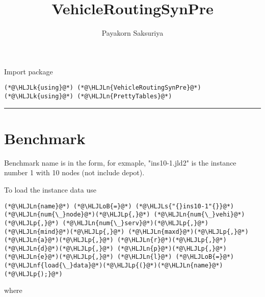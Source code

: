 \documentclass[12pt,a4paper]{article}
\title{ VehicleRoutingSynPre }
\author{ Payakorn Saksuriya }
\newcommand{\HLJLk}[1]{\textcolor[RGB]{148,91,176}{\textbf{#1}}}
\newcommand{\HLJLn}[1]{#1}
\newcommand{\HLJLnf}[1]{\textcolor[RGB]{66,102,213}{#1}}
\newcommand{\HLJLs}[1]{\textcolor[RGB]{201,61,57}{#1}}
\newcommand{\HLJLoB}[1]{\textcolor[RGB]{102,102,102}{\textbf{#1}}}
\newcommand{\HLJLp}[1]{#1}
\begin{document}
\maketitle

Import package


\begin{lstlisting}
(*@\HLJLk{using}@*) (*@\HLJLn{VehicleRoutingSynPre}@*)
(*@\HLJLk{using}@*) (*@\HLJLn{PrettyTables}@*)
\end{lstlisting}


\rule{\textwidth}{1pt}
\section{Benchmark}
Benchmark name is in the form, for exmaple, "ins10-1.jld2" is the instance number 1 with 10 nodes (not include depot).

To load the instance data use


\begin{lstlisting}
(*@\HLJLn{name}@*) (*@\HLJLoB{=}@*) (*@\HLJLs{"{}ins10-1"{}}@*)
(*@\HLJLn{num{\_}node}@*)(*@\HLJLp{,}@*) (*@\HLJLn{num{\_}vehi}@*)(*@\HLJLp{,}@*) (*@\HLJLn{num{\_}serv}@*)(*@\HLJLp{,}@*) (*@\HLJLn{mind}@*)(*@\HLJLp{,}@*) (*@\HLJLn{maxd}@*)(*@\HLJLp{,}@*) (*@\HLJLn{a}@*)(*@\HLJLp{,}@*) (*@\HLJLn{r}@*)(*@\HLJLp{,}@*) (*@\HLJLn{d}@*)(*@\HLJLp{,}@*) (*@\HLJLn{p}@*)(*@\HLJLp{,}@*) (*@\HLJLn{e}@*)(*@\HLJLp{,}@*) (*@\HLJLn{l}@*) (*@\HLJLoB{=}@*) (*@\HLJLnf{load{\_}data}@*)(*@\HLJLp{(}@*)(*@\HLJLn{name}@*)(*@\HLJLp{);}@*)
\end{lstlisting}


where
\end{document}
